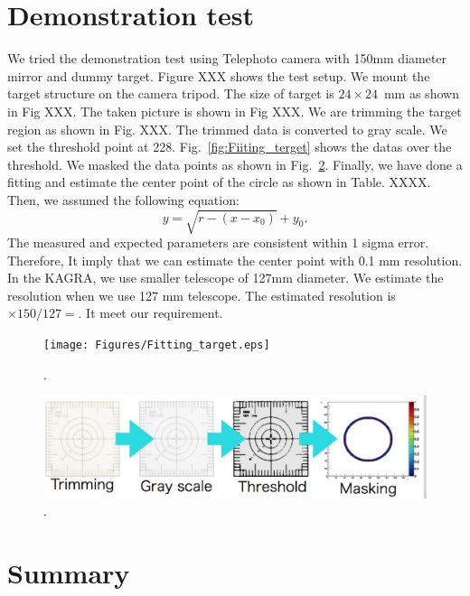 \section{Demonstration test}
We tried the demonstration test using Telephoto camera with 150mm diameter mirror and dummy target.
Figure XXX shows the test setup. We mount the target structure on the camera tripod. The size of target is $24 \times 24$~mm as shown in Fig XXX. The taken picture is shown in Fig XXX.
We are trimming the target region as shown in Fig. XXX. The trimmed data is converted to gray scale. We set the threshold point at 228.
Fig.~\ref{fig:Fiiting_terget} shows the datas over the threshold.
We masked the data points as shown in Fig.~\ref{fig:Analysis_cam}.
Finally, we have done a fitting and estimate the center point of the circle as shown in Table. XXXX.
Then, we assumed the following equation:
\begin{equation}
y=\sqrt{r-(x-x_0)}+y_0.
\end{equation} 
The measured and expected parameters are consistent within 1 sigma error.
Therefore, It imply that we can estimate the center point with 0.1 mm resolution.
In the KAGRA, we use smaller telescope of 127mm diameter.
We estimate the resolution when we use 127 mm telescope.
The estimated resolution is $\times 150/127=$. It meet our requirement.

   \begin{figure}
\begin{center}
\texttt{[image: Figures/Fitting\_target.eps]}
\caption{.} 
\label{fig:Fitting_target} 
\end{center}
\end{figure}
   


   \begin{figure}
\begin{center}
\includegraphics[width=14cm]{Figures/Analysis_cam.eps}
\caption{.} 
\label{fig:Analysis_cam} 
\end{center}
\end{figure}

\section{Summary}

 